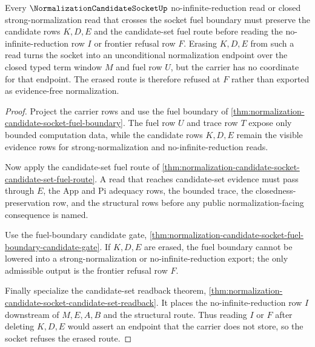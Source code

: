 \begin{theorem}
\label{thm:normalization-candidate-socket-fuel-erasure-refusal}
Every $\NormalizationCandidateSocketUp$ no-infinite-reduction read or closed strong-normalization read that crosses the socket fuel boundary must preserve the candidate rows $K,D,E$ and the candidate-set fuel route before reading the no-infinite-reduction row $I$ or frontier refusal row $F$. Erasing $K,D,E$ from such a read turns the socket into an unconditional normalization endpoint over the closed typed term window $M$ and fuel row $U$, but the carrier has no coordinate for that endpoint. The erased route is therefore refused at $F$ rather than exported as evidence-free normalization.
\end{theorem}
\begin{proof}
Project the carrier rows and use the fuel boundary of \autoref{thm:normalization-candidate-socket-fuel-boundary}. The fuel row $U$ and trace row $T$ expose only bounded computation data, while the candidate rows $K,D,E$ remain the visible evidence rows for strong-normalization and no-infinite-reduction reads.

Now apply the candidate-set fuel route of \autoref{thm:normalization-candidate-socket-candidate-set-fuel-route}. A read that reaches candidate-set evidence must pass through $E$, the App and Pi adequacy rows, the bounded trace, the closedness-preservation row, and the structural rows before any public normalization-facing consequence is named.

Use the fuel-boundary candidate gate, \autoref{thm:normalization-candidate-socket-fuel-boundary-candidate-gate}. If $K,D,E$ are erased, the fuel boundary cannot be lowered into a strong-normalization or no-infinite-reduction export; the only admissible output is the frontier refusal row $F$.

Finally specialize the candidate-set readback theorem, \autoref{thm:normalization-candidate-socket-candidate-set-readback}. It places the no-infinite-reduction row $I$ downstream of $M,E,A,B$ and the structural route. Thus reading $I$ or $F$ after deleting $K,D,E$ would assert an endpoint that the carrier does not store, so the socket refuses the erased route.
\end{proof}

